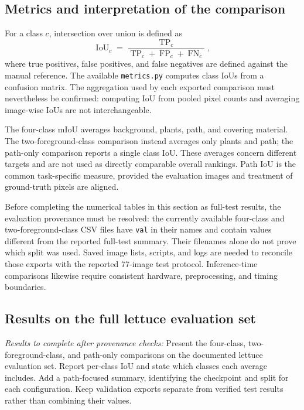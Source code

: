 \subsection{Metrics and interpretation of the comparison}
\label{subsec:c3_supervision_metrics}

For a class $c$, intersection over union is defined as
\begin{equation}
    \operatorname{IoU}_c=
    \frac{\operatorname{TP}_c}
         {\operatorname{TP}_c+\operatorname{FP}_c+\operatorname{FN}_c},
    \label{eq:c3_iou}
\end{equation}
where true positives, false positives, and false negatives are defined
against the manual reference. The available \texttt{metrics.py} computes
class IoUs from a confusion matrix. The aggregation used by each exported
comparison must nevertheless be confirmed: computing IoU from pooled
pixel counts and averaging image-wise IoUs are not interchangeable.

The four-class mIoU averages background, plants, path, and covering
material. The two-foreground-class comparison instead averages only
plants and path; the path-only comparison reports a single class IoU.
These averages concern different targets and are not used as directly
comparable overall rankings. Path IoU is the common task-specific measure,
provided the evaluation images and treatment of ground-truth pixels
are aligned.

Before completing the numerical tables in this section as full-test
results, the evaluation provenance must be
resolved: the currently available four-class and two-foreground-class
CSV files have \texttt{val} in their names and contain values different
from the reported full-test summary. Their filenames alone do not prove
which split was used. Saved image lists, scripts, and logs are needed to
reconcile those exports with the reported 77-image test protocol.
Inference-time comparisons likewise require consistent hardware,
preprocessing, and timing boundaries.

\subsection{Results on the full lettuce evaluation set}
\label{subsec:c3_supervision_full_results}

\emph{Results to complete after provenance checks:} Present the four-class,
two-foreground-class, and path-only comparisons on the documented lettuce
evaluation set. Report per-class IoU and state which classes each average
includes. Add a path-focused summary, identifying the checkpoint and split
for each configuration. Keep validation exports separate from verified
test results rather than combining their values.


